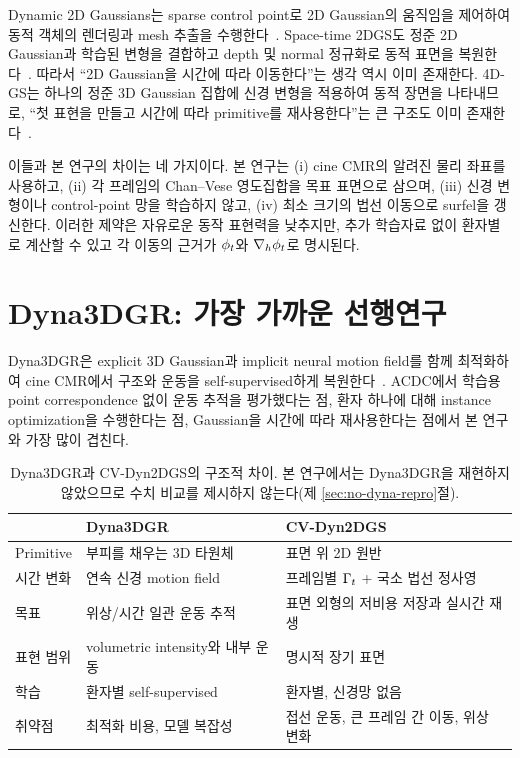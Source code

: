 Dynamic 2D Gaussians는 sparse control point로 2D Gaussian의 움직임을 제어하여 동적
객체의 렌더링과 mesh 추출을 수행한다~\citep{zhang2025_d2dgs}. Space-time 2DGS도
정준 2D Gaussian과 학습된 변형을 결합하고 depth 및 normal 정규화로 동적 표면을
복원한다~\citep{wang2024_st2dgs}. 따라서 ``2D Gaussian을 시간에 따라 이동한다''는
생각 역시 이미 존재한다. 4D-GS는 하나의 정준 3D Gaussian 집합에 신경 변형을 적용하여
동적 장면을 나타내므로, ``첫 표현을 만들고 시간에 따라 primitive를 재사용한다''는
큰 구조도 이미 존재한다~\citep{wu2024_4dgs}.

이들과 본 연구의 차이는 네 가지이다. 본 연구는 (i) cine CMR의 알려진 물리 좌표를
사용하고, (ii) 각 프레임의 Chan--Vese 영도집합을 목표 표면으로 삼으며, (iii) 신경
변형이나 control-point 망을 학습하지 않고, (iv) 최소 크기의 법선 이동으로 surfel을
갱신한다. 이러한 제약은 자유로운 동작 표현력을 낮추지만, 추가 학습자료 없이 환자별로
계산할 수 있고 각 이동의 근거가 $\phi_t$와 $\nabla_h\phi_t$로 명시된다.

\section{Dyna3DGR: 가장 가까운 선행연구}
\label{sec:dyna3dgr}

Dyna3DGR은 explicit 3D Gaussian과 implicit neural motion field를 함께 최적화하여
cine CMR에서 구조와 운동을 self-supervised하게 복원한다~\citep{fu2025_dyna3dgr}.
ACDC에서 학습용 point correspondence 없이 운동 추적을 평가했다는 점, 환자 하나에
대해 instance optimization을 수행한다는 점, Gaussian을 시간에 따라 재사용한다는
점에서 본 연구와 가장 많이 겹친다.

\begin{table}[htbp]
\centering
\small
\caption{Dyna3DGR과 CV-Dyn2DGS의 구조적 차이. 본 연구에서는 Dyna3DGR을 재현하지
않았으므로 수치 비교를 제시하지 않는다(제 \ref{sec:no-dyna-repro}절).}
\label{tab:dyna3dgr}
\begin{tabular}{@{}lll@{}}
\toprule
 & Dyna3DGR & CV-Dyn2DGS \\
\midrule
Primitive & 부피를 채우는 3D 타원체 & 표면 위 2D 원반 \\
시간 변화 & 연속 신경 motion field & 프레임별 $\Gamma_t$ + 국소 법선 정사영 \\
목표 & 위상/시간 일관 운동 추적 & 표면 외형의 저비용 저장과 실시간 재생 \\
표현 범위 & volumetric intensity와 내부 운동 & 명시적 장기 표면 \\
학습 & 환자별 self-supervised & 환자별, 신경망 없음 \\
취약점 & 최적화 비용, 모델 복잡성 & 접선 운동, 큰 프레임 간 이동, 위상 변화 \\
\bottomrule
\end{tabular}
\end{table}

